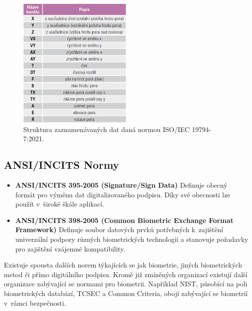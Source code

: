 \begin{figure}[h]
  \centering
  \includegraphics[width=0.5\textwidth]{obrazky-figures/normy.png}
  \caption{Struktura zaznamenávaných dat daná normou ISO/IEC 19794-7:2021.~\cite{DSM2021}} %
  \label{fig:norms_table}
\end{figure}

\newpage

\subsection*{ANSI/INCITS Normy}
\begin{itemize}
  \item \textbf{ANSI/INCITS 395-2005 (Signature/Sign Data)}  
  Definuje obecný formát pro výměnu dat digitalizovaného podpisu. Díky své obecnosti lze použít v~široké škále aplikací.~\cite{ANSI_INCITS_395_2005} %
  
  \item \textbf{ANSI/INCITS 398-2005 (Common Biometric Exchange Format Framework)}  
  Definuje soubor datových prvků potřebných k~zajištění univerzální podpory různých biometrických technologií a stanovuje požadavky pro zajištění vzájemné kompatibility.~\cite{DrahanskýMartin2011} %
\end{itemize}

Existuje spousta dalších norem týkajících se jak biometrie, jiných biometrických metod či přímo digitálního podpisu.                %
Kromě již zmíněných organizací existují další organizace zabývající se normami pro biometrii.                                      %
Například NIST, působící na poli biometrických databází, TCSEC a Common Criteria, obojí zabývající se biometrií v~rámci bezpečnosti.~\cite{DrahanskýMartin2011}%

